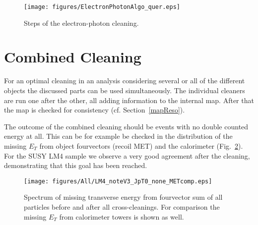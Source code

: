\documentclass{cmspaper}
\begin{document}
\begin{figure}[hbt]
\begin{center}
\texttt{[image: figures/ElectronPhotonAlgo\_quer.eps]}
\caption{Steps of the electron-photon cleaning.}
\label{fig:EPCleaning}
\end{center}
\end{figure}



\section{Combined Cleaning}
For an optimal cleaning in an analysis considering several or all of the
different objects the discussed parts can be used simultaneously. The individual
cleaners are run one after the other, all adding information to the internal
map. After that the map is checked for consistency (cf. Section~\ref{mapReso}).

The outcome of the combined cleaning should be events with no double counted
energy at all. This can be for example be checked in the distribution of the
missing $E_T$ from object fourvectors (recoil MET) and the calorimeter
(Fig.~\ref{fig:allMET}). For the SUSY LM4 sample we observe a very good
agreement after the cleaning, demonstrating that this goal has been reached.

\begin{figure}[hb]
\begin{center}
    \texttt{[image: figures/All/LM4\_noteV3\_JpT0\_none\_METcomp.eps]}
    \caption{Spectrum of missing transverse energy from fourvector sum of all
    particles before and after all cross-cleanings. For comparison
    the missing $E_T$ from calorimeter towers is shown as well.}
\label{fig:allMET}
\end{center}
\end{figure}
\end{document}
